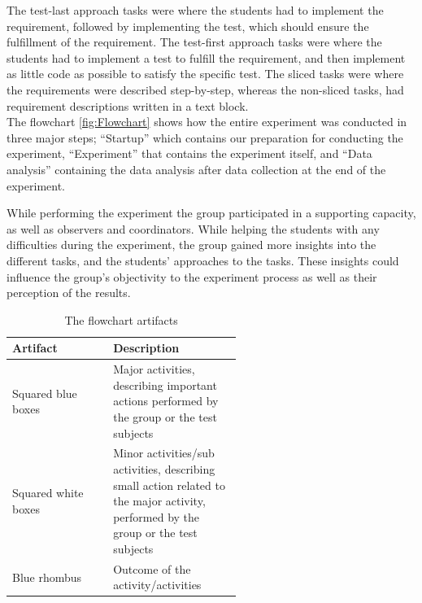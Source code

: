 \documentclass{sig-alternate-05-2015}
\begin{document}
The test-last approach tasks were where the students had to implement the requirement, followed by implementing the test, which should ensure the fulfillment of the requirement.
The test-first approach tasks were where the students had to implement a test to fulfill the requirement, and then implement as little code as possible to satisfy the specific test.
The sliced tasks were where the requirements were described step-by-step, whereas the non-sliced tasks, had requirement descriptions written in a text block.\\



The flowchart \ref{fig:Flowchart} shows how the entire experiment was conducted in three major steps; ``Startup'' which contains our preparation for conducting the experiment, ``Experiment'' that contains the experiment itself, and ``Data analysis'' containing the data analysis after data collection at the end of the experiment.

While performing the experiment the group participated in a supporting capacity, as well as observers and coordinators. While helping the students with any difficulties during the experiment, the group gained more insights into the different tasks, and the students' approaches to the tasks. These insights could influence the group's objectivity to the experiment process as well as their perception of the results.

\begin{table}[!ht]
\centering
\caption{The flowchart artifacts}
\label{tab:The flowchart artifacts:}
\begin{tabular}{|l|p{0.56\linewidth}|}
\hline
\textbf{Artifact} & \textbf{Description} \\
\hline
\hline
Squared blue boxes & Major activities, describing important actions performed by the group or the test subjects\\
Squared white boxes & Minor activities/sub activities, describing small action related to the major activity, performed by the group or the test subjects\\
Blue rhombus & Outcome of the activity/activities\\
\hline
\end{tabular}
\end{table}
\end{document}

